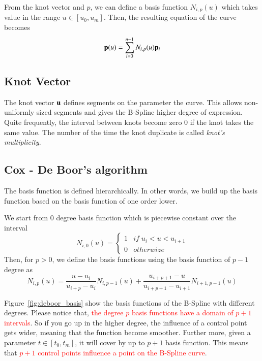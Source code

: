 %
From the knot vector and $p$, we can define a basis function $N_{i,p}(u)$ which takes value in the range $u\in [u_0,u_m]$.
%
Then, the resulting equation of the curve becomes
%
\begin{equation}
\mathbf{p}(u) = \sum_{i=0}^{n-1} N_{i,p}(u)\mathbf{p}_i
\end{equation}


\subsection{Knot Vector}

The knot vector $\mathbf{u}$ defines segments on the parameter the curve.
%
This allows non-uniformly sized segments and gives the B-Spline higher degree of expression.
%
Quite frequently, the interval between knots become zero $0$ if the knot takes the same value.
%
The number of the time the knot duplicate is called \textit{knot’s multiplicity}.



\subsection{Cox - De Boor's algorithm}

The basis function is defined hierarchically. 
%
In other words, we build up the basis function based on the basis function of one order lower.


We start from $0$ degree basis function which is piecewise constant over the interval
%
\begin{equation}
N_{i,0} (u)
= \left\{ \begin{array}{rl}
1 & if \; u_i < u < u_{i+1} \\
0 & otherwize
\end{array}\right.
\end{equation}
%
Then, for $p>0$, we define the basis functions using the basis function of $p-1$ degree as
%
\begin{equation}
N_{i,p}(u) = 
\frac{u-u_{i}}{u_{i+p}-u_i} N_{i,p-1}(u)
+ 
\frac{u_{i+p+1}-u}{u_{i+p+1}-u_{i+1}} N_{i+1,p-1}(u)
\label{eqn:deboor}
\end{equation}

Figure~\ref{fig:deboor_basis} show the basis functions of the B-Spline with different degrees. 
%
Please notice that, \textcolor{red}{the degree $p$ basis functions have a domain of $p+1$ intervals}.
%
So if you go up in the higher degree, the influence of a control point gets wider, meaning that the function become smoother. 
%
Further more, given a parameter $t\in [t_0,t_m]$, it will cover by up to $p+1$ basis function.
%
This means that \textcolor{red}{$p+1$ control points influence a point on the B-Spline curve}.

